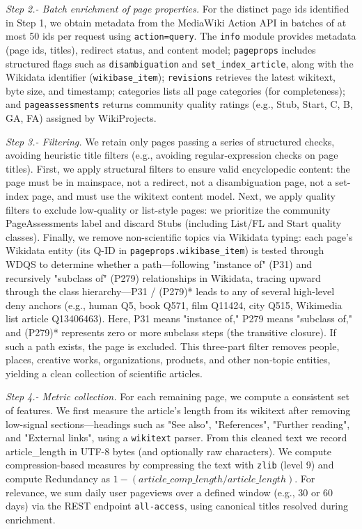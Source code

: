 \emph{Step 2.- Batch enrichment of page properties.} For the distinct page ids identified in Step 1, we obtain metadata from the MediaWiki Action API in batches of at most 50 ids per request using \texttt{action=query}. The \texttt{info} module provides metadata (page ids, titles), redirect status, and content model; \texttt{pageprops} includes structured flags such as \texttt{disambiguation} and \texttt{set\_index\_article}, along with the Wikidata identifier (\texttt{wikibase\_item}); \texttt{revisions} retrieves the latest wikitext, byte size, and timestamp; categories lists all page categories (for completeness); and \texttt{pageassessments} returns community quality ratings (e.g., Stub, Start, C, B, GA, FA) assigned by WikiProjects.

\emph{Step 3.- Filtering.} We retain only pages passing a series of structured checks, avoiding heuristic title filters (e.g., avoiding regular-expression checks on page titles). First, we apply structural filters to ensure valid encyclopedic content: the page must be in mainspace, not a redirect, not a disambiguation page, not a set-index page, and must use the wikitext content model. Next, we apply quality filters to exclude low-quality or list-style pages: we prioritize the community PageAssessments label and discard Stubs (including List/FL and Start quality classes).  Finally, we remove non-scientific topics via Wikidata typing: each page's Wikidata entity (its Q-ID in \texttt{pageprops.wikibase\_item}) is tested through WDQS to determine whether a path—following "instance of" (P31) and recursively "subclass of" (P279) relationships in Wikidata, tracing upward through the class hierarchy—P31 / (P279)* leads to any of several high-level deny anchors (e.g., human Q5, book Q571, film Q11424, city Q515, Wikimedia list article Q13406463). Here, P31 means "instance of," P279 means "subclass of," and (P279)* represents zero or more subclass steps (the transitive closure). If such a path exists, the page is excluded. This three-part filter removes people, places, creative works, organizations, products, and other non-topic entities, yielding a clean collection of scientific articles.

\emph{Step 4.- Metric collection.} For each remaining page, we compute a consistent set of features. We first  measure the article's length from its wikitext after removing low-signal sections—headings such as "See also", "References", "Further reading", and "External links", using a \texttt{wikitext} parser. From this cleaned text we record article\_length in UTF-8 bytes (and optionally raw characters). We compute compression-based measures by compressing the text with \texttt{zlib} (level 9) and compute Redundancy as $1 - (article\_comp\_length / article\_length)$. For relevance, we sum daily user pageviews over a defined window (e.g., 30 or 60 days) via the REST endpoint \texttt{all-access}, using canonical titles resolved during enrichment.

